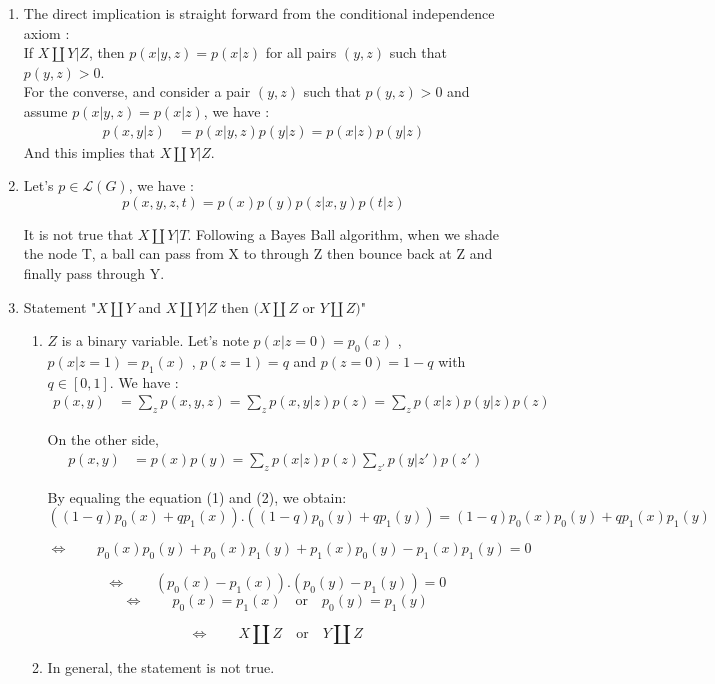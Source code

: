 \documentclass[a4paper,10pt]{article}
\begin{document}
\begin{enumerate}
\item The direct implication is straight forward from the conditional independence axiom : \\

If $X \amalg Y | Z$, then $p(x |y,z) = p(x|z)$ for all pairs $(y,z)$ such that $p(y,z) >0 $. \\

For the converse, and consider a pair $(y,z)$ such that $p(y,z) >0$ and assume $p(x|y,z) = p(x|z)$, we have : 
\begin{align*}
p(x,y|z) & = p(x|y,z) p(y|z)   = p(x|z) p(y|z) 
\end{align*}
And this implies that $X \amalg Y | Z$.
\item Let's $p \in \mathcal{L}(G)$, we have : 
\[ 
p(x,y,z,t) = p(x) p(y) p(z|x,y) p(t|z)
\] 

It is not true that $X \amalg Y | T$. Following a Bayes Ball algorithm, when we shade the node T, a ball can pass from X to through Z then bounce back at Z and finally pass through Y.

\item Statement "$ X \amalg Y $ and $ X \amalg Y | Z$ then $ ( X \amalg Z$ or $Y\amalg Z)$"
\begin{enumerate}

\item $Z$ is a binary variable. Let's note $p(x|z=0) = p_0(x) $ , $p(x|z=1) = p_1(x) $ , $p(z=1) = q$ and $p(z=0) = 1-q$ with $ q \in [0,1]$.
We have : 
\begin{align}
p(x,y) & = \sum_{z}  p(x,y,z) = \sum_z p(x,y|z) p(z)  = \sum_z p(x|z) p(y|z) p(z) 
\end{align}

On the other side, 
\begin{align}
p(x,y) &= p(x)p(y) = \sum_{z} p(x|z)p(z) \sum_{z'} p(y|z') p(z') 
\end{align}

By equaling the equation (1) and (2), we obtain: 
\[ 
\left( (1-q) p_0(x) + q p_1(x) \right) . \left( (1-q) p_0(y) + q p_1(y) \right) =  (1-q) p_0(x) p_0(y) + q p_1(x) p_1(y)
\] 

\[ 
\Leftrightarrow  \qquad p_0(x) p_0(y)  + p_0(x) p_1(y) + p_1(x) p_0(y)  - p_1(x) p_1(y) = 0
\]

\[ 
\Leftrightarrow  \qquad  (p_0(x) - p_1(x) ) . ( p_0(y)  - p_1(y))  = 0
\]
\[ 
\Leftrightarrow  \qquad  p_0(x) =  p_1(x) \quad \text{or} \quad  p_0(y)  = p_1(y)  
\]

\[ 
\Leftrightarrow  \qquad  X \amalg Z \quad \text{or} \quad Y \amalg Z
\]
\item In general, the statement is not true.
\end{enumerate}

\end{enumerate}
\end{document}
